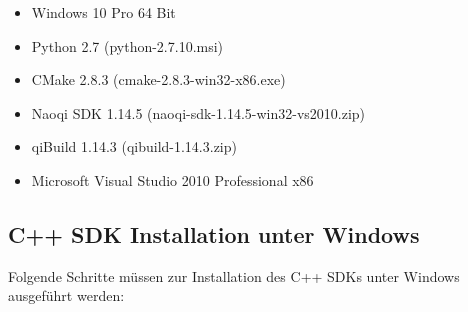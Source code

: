             \begin{itemize}
                \item Windows 10 Pro 64 Bit
                \item Python 2.7 (python-2.7.10.msi)
                \item CMake 2.8.3 (cmake-2.8.3-win32-x86.exe)
                \item Naoqi SDK 1.14.5 (naoqi-sdk-1.14.5-win32-vs2010.zip)
                \item qiBuild 1.14.3 (qibuild-1.14.3.zip)
                \item Microsoft Visual Studio 2010 Professional x86
            \end{itemize}

        \subsection{C++ SDK Installation unter Windows}

            Folgende Schritte müssen zur Installation des C++ SDKs unter Windows
            ausgeführt werden:

